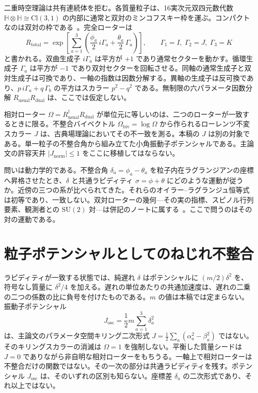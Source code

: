 \documentclass[a4paper]{article}
\begin{document}
二重時空理論は共有連続体を拒む。各質量粒子は、16実次元双四元数代数 \(\mathbb{H}\otimes\mathbb{H}\cong\mathrm{Cl}(3,1)\) の内部に通常と双対のミンコフスキー枠を運ぶ。コンパクトなのは双対の枠である~\cite{dst-main}。完全ローターは
\[
R_{\mathrm{total}}
  =\exp\!\left[\sum_{a=1}^3\left(\frac{\phi_a}{2}\,i\Gamma_a+\frac{\theta_a}{2}\,\Gamma_a\right)\right],
\qquad
\Gamma_1=I,\;\Gamma_2=J,\;\Gamma_3=K
\]
と書かれる。双曲生成子 \(i\Gamma_a\) は平方が \(+1\) であり通常セクターを動かす。循環生成子 \(\Gamma_a\) は平方が \(-1\) であり双対セクターを回転させる。同軸の通常生成子と双対生成子は可換であり、一軸の指数は因数分解する。異軸の生成子は反可換であり、\(p\,i\Gamma_a+q\,\Gamma_b\) の平方はスカラー \(p^2-q^2\) である。無制限の六パラメータ因数分解 \(R_{\mathrm{usual}}R_{\mathrm{dual}}\) は、ここでは仮定しない。

相対ローター \(\Omega=R_{\mathrm{usual}}^\dagger R_{\mathrm{dual}}\) が単位元に等しいのは、二つのローターが一致するときに限る。不整合バイベクトル \(\Omega_{\mathrm{biv}}=\log\Omega\) から作られるローレンツ不変スカラー \(J\) は、古典場理論においてその不一致を測る。本稿の \(J\) は別の対象である。単一粒子の不整合角から組み立てた小角振動子ポテンシャルである。主論文の許容天井 \(\lvert J_{\mathrm{norm}}\rvert\le 1\) をここに移植してはならない。

問いは動力学的である。不整合角 \(\delta_a=\phi_a-\theta_a\) を粒子内在ラグランジアンの座標へ昇格させたとき、\(\delta\) と共通ラピディティ \(\sigma=\phi+\theta\) にどのような運動が従うか。近傍の三つの系が比べられてきた。それらのオイラー--ラグランジュ恒等式は初等であり、一致しない。双対ローターの幾何---その実の指標、スピノル行列要素、観測者との \(\mathrm{SU}(2)\) 対---は併記のノートに属する~\cite{dst-de-broglie-wave}。ここで問うのはその対の運動である。

\section{粒子ポテンシャルとしてのねじれ不整合}

ラピディティが一致する状態では、純遅れ \(\delta\) はポテンシャルに \((m/2)\delta^2\) を、符号なし質量に \(\delta^2/4\) を加える。遅れの単位あたりの共通加速度は、遅れの二乗の二つの係数の比に負号を付けたものである。\(m\) の値は本稿では定まらない。振動子ポテンシャル
\[
J_{\mathrm{osc}}
  =\frac12 m\sum_{a=1}^3\delta_a^2
\]
は、主論文のパラメータ空間キリング二次形式 \(J=\frac12\sum_a(\alpha_a^2-\beta_a^2)\) ではない。そのキリングスカラーの消滅は \(\Omega=1\) を強制しない。平衡した質量シードは \(J=0\) でありながら非自明な相対ローターをもちうる。一軸上で相対ローターは不整合だけの関数ではない。その一次の部分は共通ラピディティを残す。ポテンシャル \(J_{\mathrm{osc}}\) は、そのいずれの区別も知らない。座標差 \(\delta_a\) の二次形式であり、それ以上ではない。
\end{document}
